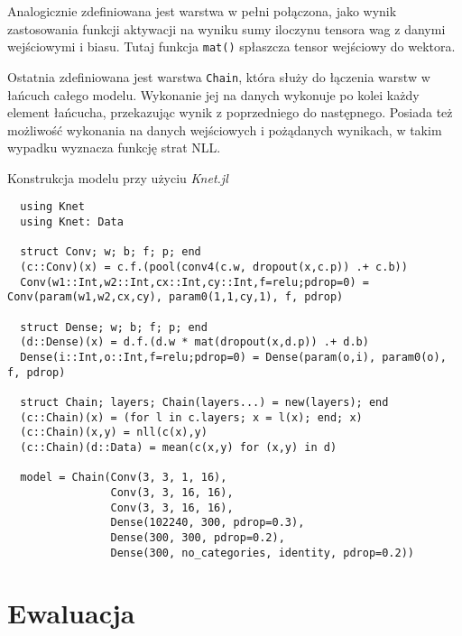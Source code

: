 \documentclass[pl,12pt]{aghdpl}
\let\Oldchapter\chapter%
\renewcommand{\chapter}{\FloatBarrier\Oldchapter}
\begin{document}
Analogicznie zdefiniowana jest warstwa w pełni połączona, jako wynik
zastosowania funkcji aktywacji na wyniku sumy iloczynu tensora wag z danymi
wejściowymi i biasu. Tutaj funkcja \lstinline|mat()| spłaszcza tensor wejściowy
do wektora.

Ostatnia zdefiniowana jest warstwa \lstinline|Chain|, która służy do łączenia
warstw w łańcuch całego modelu. Wykonanie jej na danych wykonuje po kolei każdy
element łańcucha, przekazując wynik z poprzedniego do następnego. Posiada też
możliwość wykonania na danych wejściowych i pożądanych wynikach, w takim
wypadku wyznacza funkcję strat NLL.

\begin{program}
  \caption{Konstrukcja modelu przy użyciu \textit{Knet.jl}}
  \label{lst:Knet_model}
  \begin{lstlisting}
  using Knet
  using Knet: Data

  struct Conv; w; b; f; p; end
  (c::Conv)(x) = c.f.(pool(conv4(c.w, dropout(x,c.p)) .+ c.b))
  Conv(w1::Int,w2::Int,cx::Int,cy::Int,f=relu;pdrop=0) = Conv(param(w1,w2,cx,cy), param0(1,1,cy,1), f, pdrop)

  struct Dense; w; b; f; p; end
  (d::Dense)(x) = d.f.(d.w * mat(dropout(x,d.p)) .+ d.b)
  Dense(i::Int,o::Int,f=relu;pdrop=0) = Dense(param(o,i), param0(o), f, pdrop)

  struct Chain; layers; Chain(layers...) = new(layers); end
  (c::Chain)(x) = (for l in c.layers; x = l(x); end; x)
  (c::Chain)(x,y) = nll(c(x),y)
  (c::Chain)(d::Data) = mean(c(x,y) for (x,y) in d)

  model = Chain(Conv(3, 3, 1, 16),
                Conv(3, 3, 16, 16),
                Conv(3, 3, 16, 16),
                Dense(102240, 300, pdrop=0.3),
                Dense(300, 300, pdrop=0.2),
                Dense(300, no_categories, identity, pdrop=0.2))
  \end{lstlisting}
\end{program}
\chapter{Ewaluacja}
\end{document}
